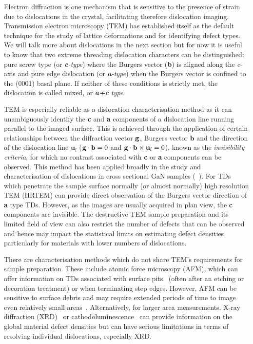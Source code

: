 Electron diffraction is one mechanism that is sensitive to the presence of strain due to dislocations in the crystal, facilitating therefore dislocation imaging. Transmission electron microscopy (TEM) has established itself as the default technique for the study of lattice deformations and for identifying defect types. We will talk more about dislocations in the next section but for now it is useful to know that two extreme \hkl[0001] threading dislocation characters can be distinguished: pure screw type (or \textit{\textbf{c}-type}) where the Burgers vector (\textbf{b}) is aligned along the \textit{c}-axis and pure edge dislocation (or \textit{\textbf{a}-type}) when the Burgers vector is confined to the (0001) basal plane. If neither of these conditions is strictly met, the dislocation is called mixed, or \textit{\textbf{a+c} type}.



TEM is especially reliable as a dislocation characterisation method as it can unambiguously identify  the \textbf{c} and \textbf{a} components of a dislocation line running parallel to the imaged surface. This is achieved through the application of certain relationships between the diffraction vector $\vb{g}$, Burgers vector $\mathbf{b}$ and the direction of the dislocation line $\mathbf{u}_l$ ($\vb{g} \cdot \vb{b} = 0$ and $\vb{g} \cdot \vb{b} \times \vb{ u}_l = 0$), known as the \textit{invisibility criteria}, for which no contrast associated
with \textbf{c} or \textbf{a} components can be observed. This method has been applied broadly in the study and
characterisation of dislocations in cross sectional GaN samples (\eg~\cite{Hino00}). For TDs which penetrate the sample surface normally (or almost normally) high resolution TEM (HRTEM) can provide direct observation of the Burgers vector direction of \textbf{a} type TDs. However, as the images are usually acquired in plan view, the \textbf{c} components are invisible. The destructive TEM sample preparation and its limited field of view can also restrict the number of defects that can be observed and hence may impact the statistical limits on estimating defect densities, particularly for materials with lower numbers of dislocations.


There are characterisation methods which do not share TEM’s requirements for sample preparation. These include atomic force microscopy (AFM), which can offer information on TDs associated with surface pits~\cite{Craven02} (often after an etching or decoration treatment) or when terminating step edges. However, AFM can be sensitive to surface debris and may require extended periods of time to image even relatively small areas~\cite{Koinkar97}. Alternatively, for larger area measurements, X-ray diffraction (XRD)~\cite{Heinke00} or cathodoluminescence~\cite{Rosner97} can provide information on the global material defect densities but can have serious limitations in terms of resolving individual dislocations, especially XRD. 

